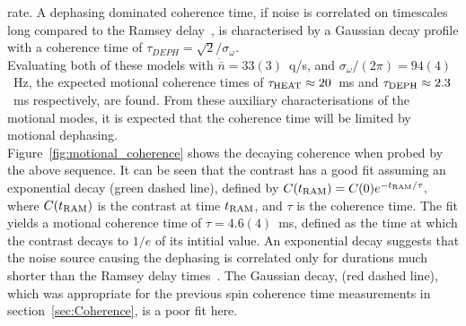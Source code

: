     rate. A dephasing dominated coherence time, if noise is correlated on timescales long compared to the Ramsey delay~\cite{omalley2015qubit}, is characterised by a Gaussian decay profile with a coherence time
    of $\tau_{DEPH} = \sqrt{2}/\sigma_{\omega}$.\\
    Evaluating both of these models with $\dot{\bar{n}}=33(3)$~q/s, and
    $\sigma_{\omega}/(2\pi) = 94(4)$~\unit{\Hz}, the expected motional coherence times of $\tau_{\rm
    HEAT} \approx 20$~ms and $\tau_{\rm DEPH} \approx 2.3$~ms respectively, are found. From these auxiliary characterisations of the motional modes, it is expected that the coherence time will be limited by motional dephasing. \\
    Figure~\ref{fig:motional_coherence} shows the decaying coherence when probed by the above sequence. It can be seen that the contrast has a good fit assuming an exponential decay (green dashed line),
    defined by $C(t_{\rm RAM}) = C(0) e^{-t_{\rm RAM}/\tau},$ where $C(t_{\rm RAM})$ is the contrast at time $t_{\rm RAM}$, and $\tau$ is the coherence time. The fit yields a motional coherence time of $\tau = 4.6(4)$~\unit{\ms}, defined as the time at which the contrast decays to $1/e$ of its intitial value. 
    An exponential decay suggests that the noise source causing the dephasing is correlated only for durations much shorter than the Ramsey delay times~\cite{omalley2015qubit}.
    The Gaussian decay, (red dashed line), which was appropriate for the previous spin coherence time measurements in section~\ref{sec:Coherence}, is a poor fit here. \\
    
    



